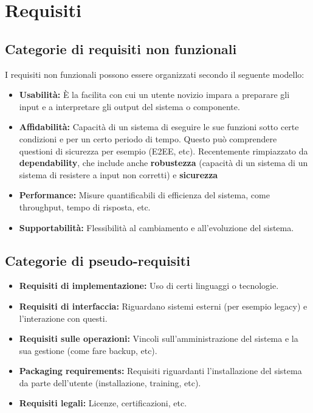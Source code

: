 \section{Requisiti}
    \subsection{Categorie di requisiti non funzionali}
    I requisiti non funzionali possono essere organizzati secondo il seguente modello:
    \begin{itemize}
        \item \textbf{Usabilità:} È la facilita con cui un utente novizio impara a preparare gli input e a interpretare gli output del sistema o componente.
        \item \textbf{Affidabilità:} Capacità di un sistema di eseguire le sue funzioni sotto certe condizioni e per un certo periodo di tempo. Questo può comprendere questioni di sicurezza per esempio (E2EE, etc). Recentemente rimpiazzato da \textbf{dependability}, che include anche \textbf{robustezza} (capacità di un sistema di un sistema di resistere a input non corretti) e \textbf{sicurezza} 
        \item \textbf{Performance:} Misure quantificabili di efficienza del sistema, come throughput, tempo di risposta, etc.
        \item \textbf{Supportabilità:} Flessibilità al cambiamento e all'evoluzione del sistema.
    \end{itemize}
    
    
    \subsection{Categorie di pseudo-requisiti}
    \begin{itemize}
        \item \textbf{Requisiti di implementazione:} Uso di certi linguaggi o tecnologie.
        \item \textbf{Requisiti di interfaccia:} Riguardano sistemi esterni (per esempio legacy) e l'interazione con questi.
        \item \textbf{Requisiti sulle operazioni:} Vincoli sull'amministrazione del sistema e la sua gestione (come fare backup, etc).
        \item \textbf{Packaging requirements:} Requisiti riguardanti l'installazione del sistema da parte dell'utente (installazione, training, etc).
        \item \textbf{Requisiti legali:} Licenze, certificazioni, etc.
    \end{itemize}
    
